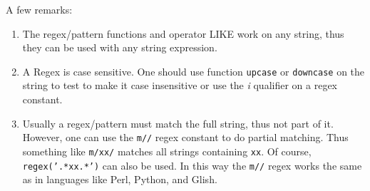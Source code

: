 A few remarks:
\begin{enumerate}
\item The regex/pattern functions and operator LIKE work on any string,
thus they can be used with any string expression.
\item A Regex is case sensitive. One should use 
function \texttt{upcase} or \texttt{downcase} on the string to test to
make it case insensitive or use the \textit{i} qualifier on a regex constant.
\item Usually a regex/pattern must match the full string, thus not part of
it. However, one can use the \texttt{m//} regex constant to do partial
matching. Thus something like \texttt{m/xx/} matches all strings
containing \texttt{xx}. Of course, \texttt{regex('.*xx.*')} can also be used.
In this way the \texttt{m//} regex works the same as in languages like
Perl, Python, and Glish. 
\end{enumerate}

